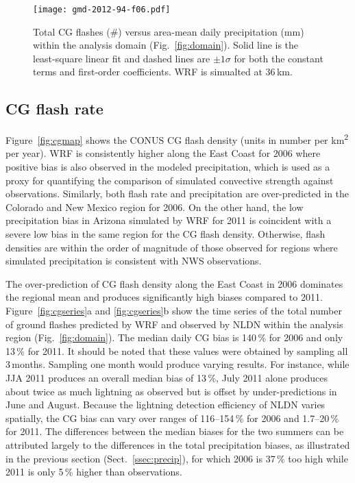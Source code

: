 \begin{figure}[t]
\texttt{[image: gmd-2012-94-f06.pdf]}
\caption{Total CG flashes (\#) versus area-mean daily precipitation
(\unit{mm}) within the analysis domain (Fig.~\ref{fig:domain}). Solid line is
the least-square linear fit and dashed lines are $\pm1\sigma$ for both the
constant terms and first-order coefficients. WRF is simualted at
36\,\unit{km}.}
      \label{fig:cgslope}
\end{figure}

\subsection{CG flash rate}\label{ssec:flashrate}

Figure~\ref{fig:cgmap} shows the CONUS CG flash density (units in number per
\unit{km^2} per year). WRF is consistently higher along the East Coast for
2006 where positive bias is also observed in the modeled precipitation, which
is used as a proxy for quantifying the comparison of simulated convective
strength against observations. Similarly, both flash rate and precipitation
are over-predicted in the Colorado and New Mexico region for 2006. On the
other hand, the low precipitation bias in Arizona simulated by WRF for 2011
is coincident with a severe low bias in the same region for the CG flash
density. Otherwise, flash densities are within the order of magnitude of
those observed for regions where simulated precipitation is consistent with
NWS observations.

The over-prediction of CG flash density along the East Coast in 2006
dominates the regional mean and produces significantly high biases compared
to 2011. Figure~\ref{fig:cgseries}a and \ref{fig:cgseries}b show the time
series of the total number of ground flashes predicted by WRF and observed by
NLDN within the analysis region (Fig.~\ref{fig:domain}). The median daily CG
bias is 140\,{\%} for 2006 and only 13\,{\%} for 2011. It should be noted
that these values were obtained by sampling all 3\,months. Sampling one month
would produce varying results. For instance, while JJA 2011 produces an
overall median bias of 13\,{\%}, July 2011 alone produces about twice as much
lightning as observed but is offset by under-predictions in June and August.
Because the lightning detection efficiency of NLDN varies spatially, the CG
bias can vary over ranges of 116--154\,{\%} for 2006 and 1.7--20\,{\%} for 2011. The differences between the median biases for the two
summers can be attributed largely to the differences in the total
precipitation biases, as illustrated in the previous section
(Sect.~\ref{ssec:precip}), for which 2006 is 37\,{\%} too high while 2011 is
only 5\,{\%} higher than observations.

